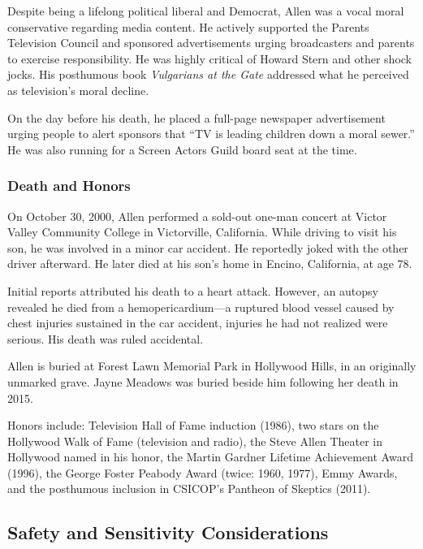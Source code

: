 \documentclass[11pt,letterpaper]{article}
\begin{document}
Despite being a lifelong political liberal and Democrat, Allen was a vocal moral conservative regarding media content. He actively supported the Parents Television Council and sponsored advertisements urging broadcasters and parents to exercise responsibility. He was highly critical of Howard Stern and other shock jocks. His posthumous book \textit{Vulgarians at the Gate} addressed what he perceived as television's moral decline.

On the day before his death, he placed a full-page newspaper advertisement urging people to alert sponsors that ``TV is leading children down a moral sewer.'' He was also running for a Screen Actors Guild board seat at the time.

\subsubsection{Death and Honors}

On October 30, 2000, Allen performed a sold-out one-man concert at Victor Valley Community College in Victorville, California. While driving to visit his son, he was involved in a minor car accident. He reportedly joked with the other driver afterward. He later died at his son's home in Encino, California, at age 78.

Initial reports attributed his death to a heart attack. However, an autopsy revealed he died from a hemopericardium---a ruptured blood vessel caused by chest injuries sustained in the car accident, injuries he had not realized were serious. His death was ruled accidental.

Allen is buried at Forest Lawn Memorial Park in Hollywood Hills, in an originally unmarked grave. Jayne Meadows was buried beside him following her death in 2015.

Honors include: Television Hall of Fame induction (1986), two stars on the Hollywood Walk of Fame (television and radio), the Steve Allen Theater in Hollywood named in his honor, the Martin Gardner Lifetime Achievement Award (1996), the George Foster Peabody Award (twice: 1960, 1977), Emmy Awards, and the posthumous inclusion in CSICOP's Pantheon of Skeptics (2011).

\subsection{Safety and Sensitivity Considerations}
\end{document}
